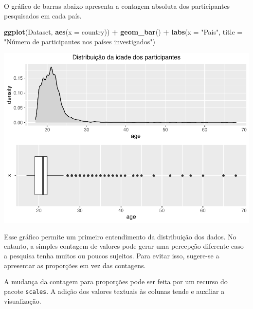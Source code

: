 \documentclass[
]{book}
\newenvironment{Shaded}{\begin{snugshade}}{\end{snugshade}}
\newcommand{\DataTypeTok}[1]{\textcolor[rgb]{0.13,0.29,0.53}{#1}}
\newcommand{\KeywordTok}[1]{\textcolor[rgb]{0.13,0.29,0.53}{\textbf{#1}}}
\newcommand{\NormalTok}[1]{#1}
\newcommand{\OperatorTok}[1]{\textcolor[rgb]{0.81,0.36,0.00}{\textbf{#1}}}
\newcommand{\StringTok}[1]{\textcolor[rgb]{0.31,0.60,0.02}{#1}}
\begin{document}
O gráfico de barras abaixo apresenta a contagem absoluta dos
participantes pesquisados em cada país.

\begin{Shaded}
\begin{Highlighting}[]
\KeywordTok{ggplot}\NormalTok{(Dataset, }\KeywordTok{aes}\NormalTok{(}\DataTypeTok{x =}\NormalTok{ country)) }\OperatorTok{+}
\StringTok{  }\KeywordTok{geom_bar}\NormalTok{() }\OperatorTok{+}
\StringTok{  }\KeywordTok{labs}\NormalTok{(}\DataTypeTok{x =} \StringTok{"País"}\NormalTok{, }\DataTypeTok{title =} \StringTok{"Número de participantes nos países investigados"}\NormalTok{)}
\end{Highlighting}
\end{Shaded}

\begin{center}\includegraphics{gitbook-demo_files/figure-latex/unnamed-chunk-19-1} \end{center}

Esse gráfico permite um primeiro entendimento da distribuição dos dados.
No entanto, a simples contagem de valores pode gerar uma percepção
diferente caso a pesquisa tenha muitos ou poucos sujeitos. Para evitar
isso, sugere-se a apresentar as proporções em vez das contagens.

A mudança da contagem para proporções pode ser feita por um recurso do
pacote \texttt{scales}. A adição dos valores textuais às colunas tende e
auxiliar a visualização.
\end{document}
